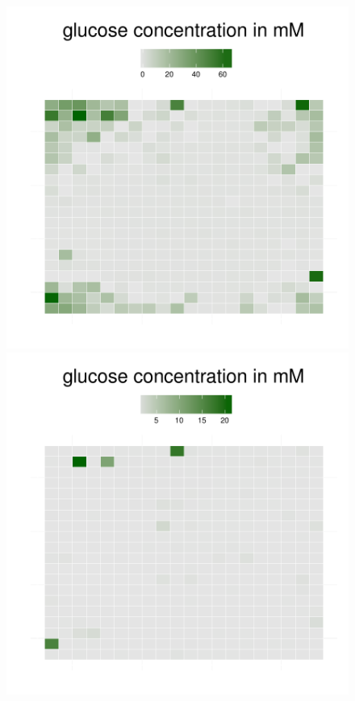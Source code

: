 \begin{figure}[h]
{\begin{minipage}[t]{0.3\textwidth}
  \end{minipage}
  \begin{minipage}[t]{0.3\textwidth}
    \includegraphics[width=\textwidth]{../results/Bcoli_20x20_seed176_gluc35.pdf}
  \end{minipage}
  \begin{minipage}[t]{0.3\textwidth}
    \includegraphics[width=\textwidth]{../results/Bcoli_20x20_seed176_gluc50.pdf}

\end{minipage}}
\end{figure}
